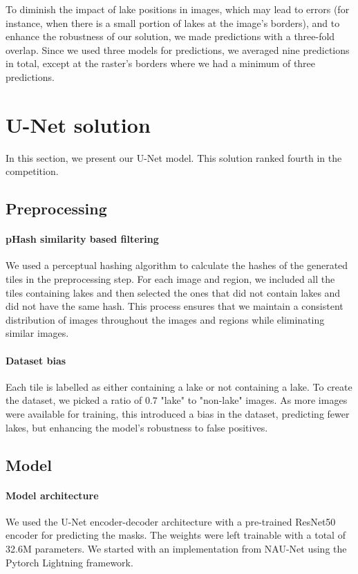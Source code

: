 \documentclass[sigconf]{acmart}
\begin{document}
To diminish the impact of lake positions in images, which may lead to errors (for instance, when there is a small portion of lakes at the image's borders), and to enhance the robustness of our solution, we made predictions with a three-fold overlap. Since we used three models for predictions, we averaged nine predictions in total, except at the raster's borders where we had a minimum of three predictions.

\section{U-Net solution}
\label{unet}

In this section, we present our U-Net model. This solution ranked fourth in the competition.

\subsection{Preprocessing}

\paragraph{pHash similarity based filtering} We used a perceptual hashing algorithm \cite{idealods2019imagededup} to calculate the hashes of the generated tiles in the preprocessing step. For each image and region, we included all the tiles containing lakes and then selected the ones that did not contain lakes and did not have the same hash. This process ensures that we maintain a consistent distribution of images throughout the images and regions while eliminating similar images.

\paragraph{Dataset bias} Each tile is labelled as either containing a lake or not containing a lake. To create the dataset, we picked a ratio of $0.7$ "lake" to "non-lake" images. As more images were available for training, this introduced a bias in the dataset, predicting fewer lakes, but enhancing the model's robustness to false positives.

\subsection{Model}

\paragraph{Model architecture} We used the U-Net\cite{ronneberger2015unet} encoder-decoder architecture with a pre-trained ResNet50\cite{he2016deep} encoder for predicting the masks. The weights were left trainable with a total of 32.6M parameters. We started with an implementation from NAU-Net\cite{wang2022nau} using the Pytorch Lightning framework.
\end{document}
